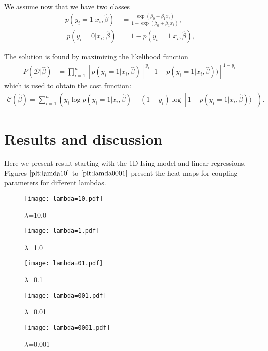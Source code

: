 \documentclass[10pt]{article}
\begin{document}
We assume now that we have two classes
 \begin{align} p(y_i=1|x_i,\hat{\beta}) &= \frac{\exp{(\beta_0+\beta_1x_i)}}{1+\exp{(\beta_0+\beta_1x_i)}}, \\\nonumber\ p(y_i=0|x_i,\hat{\beta}) &= 1 - p(y_i=1|x_i,\hat{\beta}), \end{align}

The solution is found by maximizing the likelihood function 
\begin{align} P(\mathcal{D}|\hat{\beta})& = \prod_{i=1}^n \left[p(y_i=1|x_i,\hat{\beta})\right]^{y_i}\left[1-p(y_i=1|x_i,\hat{\beta}))\right]^{1-y_i}\nonumber \ \end{align}
which is used to obtain the  cost function:
\begin{align}
\mathcal{C}(\hat{\beta}) = \sum_{i=1}^n \left( y_i\log{p(y_i=1|x_i,\hat{\beta})} + (1-y_i)\log\left[1-p(y_i=1|x_i,\hat{\beta}))\right]\right).
\end{align}


\section{Results and discussion}
Here we present result starting with the 1D Ising model and linear regressions.
Figures $\ref{plt:lamda10}$ to $\ref{plt:lamda0001}$ present the heat maps for coupling parameters for different lambdas. 



\begin{figure}
	\centerline{\texttt{[image: lambda=10.pdf]}}
	\caption{$\lambda$=10.0}
	\label{plt:lamda10}
\end{figure}

\begin{figure}
	\centerline{\texttt{[image: lambda=1.pdf]}}
	\caption{$\lambda$=1.0}
	\label{plt:lamda1}
\end{figure}

\begin{figure}
	\centerline{\texttt{[image: lambda=01.pdf]}}
	\caption{$\lambda$=0.1}
	\label{plt:lamda01}
\end{figure}

\begin{figure}
	\centerline{\texttt{[image: lambda=001.pdf]}}
	\caption{$\lambda$=0.01}
	\label{plt:lamda001}
\end{figure}

\begin{figure}
	\centerline{\texttt{[image: lambda=0001.pdf]}}
	\caption{$\lambda$=0.001}
	\label{plt:lamda0001}
\end{figure}
\end{document}
